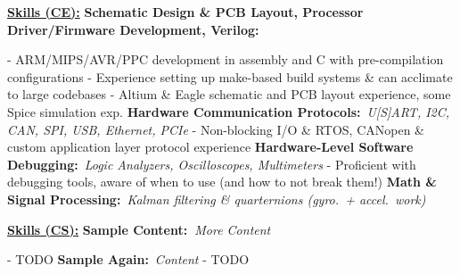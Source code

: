 \documentclass[letterpaper,10pt]{article}
\begin{document}
\noindent
\textbf{\underline{Skills (CE):}}\hspace{1.4em}%
%
{\color{maroon}\textbf{%
	Schematic Design \& PCB Layout,
	Processor Driver/Firmware Development,
	Verilog:%
}}
%
\begin{adjustwidth}{1.2in}{0in}
	{\small
		- ARM/MIPS/AVR/PPC development in assembly and C with pre-compilation configurations\break
		- Experience setting up make-based build systems \& can acclimate to large codebases\break
		- Altium \& Eagle schematic and PCB layout experience, some Spice simulation exp.\break
	}
	{\color{maroon}\textbf{Hardware Communication Protocols:}}\
	\textit{U[S]ART, I2C, CAN, SPI, USB, Ethernet, PCIe}\break
	{\small
		- Non-blocking I/O \& RTOS, CANopen \& custom application layer protocol experience\break
	}
	{\color{maroon}\textbf{Hardware-Level Software Debugging:}}\
	\textit{Logic Analyzers, Oscilloscopes, Multimeters}\break
	{\small
		- Proficient with debugging tools, aware of when to use (and how to not break them!)\break
	}
	{\color{maroon}\textbf{Math \& Signal Processing:}}\
	\textit{Kalman filtering \& quarternions (gyro.\ + accel.\ work)}
	\break
\end{adjustwidth}

\noindent
\textbf{\underline{Skills (CS):}}\hspace{1.4em}%
%
{\color{maroon}\textbf{%
	Sample Content:\
}}\textit{More Content}
%
\begin{adjustwidth}{1.2in}{0in}
	{\small - TODO}\break
	{\color{maroon}\textbf{Sample Again:}}\
	\textit{Content}\break
	{\small - TODO}\break
\end{adjustwidth}
\end{document}
